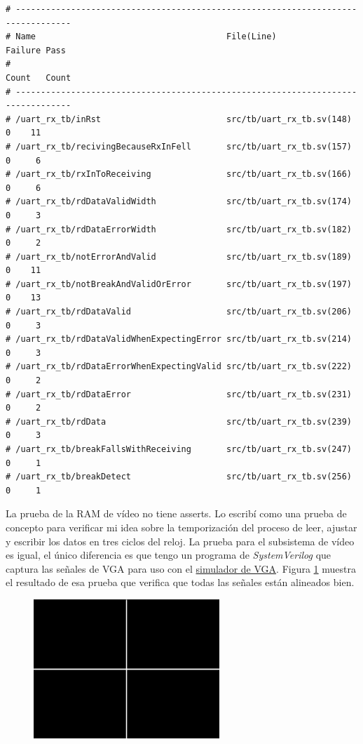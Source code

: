 \documentclass[a4paper]{article}
\begin{document}
\begin{verbatim}
# ---------------------------------------------------------------------------------
# Name                                      File(Line)                Failure Pass
#                                                                     Count   Count
# ---------------------------------------------------------------------------------
# /uart_rx_tb/inRst                         src/tb/uart_rx_tb.sv(148)       0    11
# /uart_rx_tb/recivingBecauseRxInFell       src/tb/uart_rx_tb.sv(157)       0     6
# /uart_rx_tb/rxInToReceiving               src/tb/uart_rx_tb.sv(166)       0     6
# /uart_rx_tb/rdDataValidWidth              src/tb/uart_rx_tb.sv(174)       0     3
# /uart_rx_tb/rdDataErrorWidth              src/tb/uart_rx_tb.sv(182)       0     2
# /uart_rx_tb/notErrorAndValid              src/tb/uart_rx_tb.sv(189)       0    11
# /uart_rx_tb/notBreakAndValidOrError       src/tb/uart_rx_tb.sv(197)       0    13
# /uart_rx_tb/rdDataValid                   src/tb/uart_rx_tb.sv(206)       0     3
# /uart_rx_tb/rdDataValidWhenExpectingError src/tb/uart_rx_tb.sv(214)       0     3
# /uart_rx_tb/rdDataErrorWhenExpectingValid src/tb/uart_rx_tb.sv(222)       0     2
# /uart_rx_tb/rdDataError                   src/tb/uart_rx_tb.sv(231)       0     2
# /uart_rx_tb/rdData                        src/tb/uart_rx_tb.sv(239)       0     3
# /uart_rx_tb/breakFallsWithReceiving       src/tb/uart_rx_tb.sv(247)       0     1
# /uart_rx_tb/breakDetect                   src/tb/uart_rx_tb.sv(256)       0     1
\end{verbatim}

La prueba de la RAM de vídeo no tiene asserts. Lo escribí como una prueba de concepto para verificar mi idea sobre la temporización del proceso de leer, ajustar y escribir los datos en tres ciclos del reloj. La prueba para el subsistema de vídeo es igual, el único diferencia es que tengo un programa de \textit{SystemVerilog} que captura las señales de VGA para uso con el \href{https://ericeastwood.com/lab/vga-simulator/}{simulador de VGA}. Figura \ref{fig:vga_sim} muestra el resultado de esa prueba que verifica que todas las señales están alineados bien.

\begin{figure}[!h]
\centering
\includegraphics[width=7cm]{img/vga_sim.png}
\label{fig:vga_sim}
\end{figure}
\end{document}

